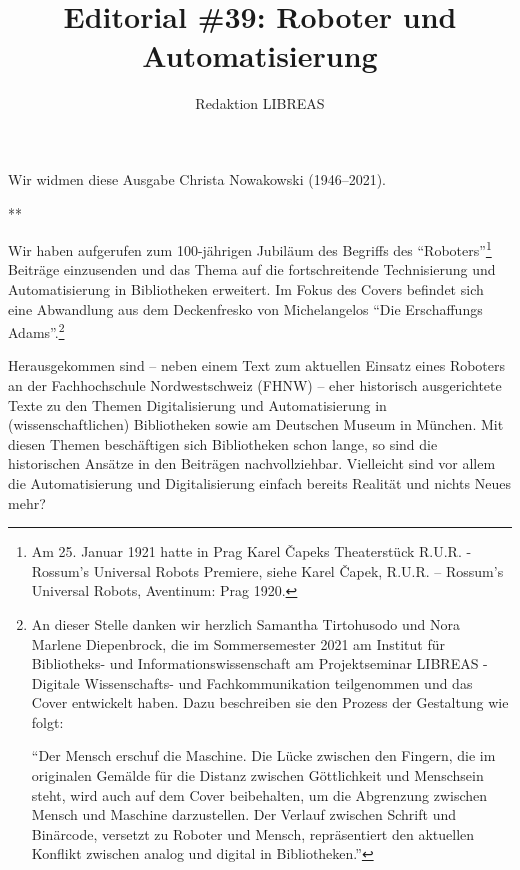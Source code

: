 \documentclass[a4paper,
fontsize=11pt,
oneside,
numbers=noperiodatend,
parskip=half-,
bibliography=totoc,
final
]{scrartcl}
\title{\LARGE{Editorial \#39: Roboter und Automatisierung}}%
\author{Redaktion LIBREAS} %
\date{}
\begin{document}
\maketitle
\thispagestyle{fancyplain} 


{\par \centering Wir widmen diese Ausgabe Christa Nowakowski (1946--2021).\par}

{\par \centering ***\par}

Wir haben aufgerufen zum 100-jährigen Jubiläum des Begriffs des
\enquote{Roboters}\footnote{Am 25. Januar 1921 hatte in Prag Karel
  Čapeks Theaterstück R.U.R. - Rossum's Universal Robots Premiere, siehe
  Karel Čapek, R.U.R. -- Rossum's Universal Robots, Aventinum: Prag
  1920.} Beiträge einzusenden und das Thema auf die fortschreitende
Technisierung und Automatisierung in Bibliotheken erweitert. Im Fokus
des Covers befindet sich eine Abwandlung aus dem Deckenfresko von
Michelangelos \enquote{Die Erschaffungs Adams}.\footnote{An dieser
  Stelle danken wir herzlich Samantha Tirtohusodo und Nora Marlene
  Diepenbrock, die im Sommersemester 2021 am Institut für Bibliotheks-
  und Informationswissenschaft am Projektseminar LIBREAS - Digitale
  Wissenschafts- und Fachkommunikation teilgenommen und das Cover
  entwickelt haben. Dazu beschreiben sie den Prozess der Gestaltung wie
  folgt:

  \enquote{Der Mensch erschuf die Maschine. Die Lücke zwischen den Fingern, die
  im originalen Gemälde für die Distanz zwischen Göttlichkeit und
  Menschsein steht, wird auch auf dem Cover beibehalten, um die
  Abgrenzung zwischen Mensch und Maschine darzustellen. Der Verlauf
  zwischen Schrift und Binärcode, versetzt zu Roboter und Mensch,
  repräsentiert den aktuellen Konflikt zwischen analog und digital in
  Bibliotheken.}}

Herausgekommen sind -- neben einem Text zum aktuellen Einsatz eines
Roboters an der Fachhochschule Nordwestschweiz (FHNW) -- eher historisch
ausgerichtete Texte zu den Themen Digitalisierung und Automatisierung in
(wissenschaftlichen) Bibliotheken sowie am Deutschen Museum in München.
Mit diesen Themen beschäftigen sich Bibliotheken schon lange, so sind
die historischen Ansätze in den Beiträgen nachvollziehbar. Vielleicht
sind vor allem die Automatisierung und Digitalisierung einfach bereits
Realität und nichts Neues mehr?
\end{document}
